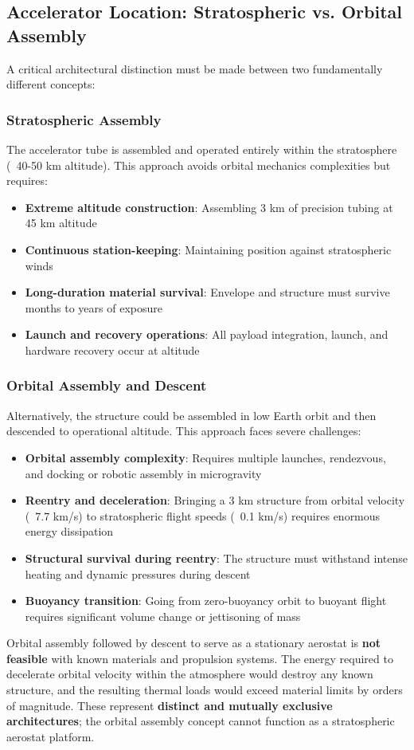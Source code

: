 \documentclass[12pt]{article}
\begin{document}
\subsection{Accelerator Location: Stratospheric vs. Orbital Assembly}
A critical architectural distinction must be made between two fundamentally different concepts:

\subsubsection{Stratospheric Assembly}
The accelerator tube is assembled and operated entirely within the stratosphere (~40-50 km altitude). This approach avoids orbital mechanics complexities but requires:
\begin{itemize}
    \item \textbf{Extreme altitude construction}: Assembling 3 km of precision tubing at 45 km altitude
    \item \textbf{Continuous station-keeping}: Maintaining position against stratospheric winds
    \item \textbf{Long-duration material survival}: Envelope and structure must survive months to years of exposure
    \item \textbf{Launch and recovery operations}: All payload integration, launch, and hardware recovery occur at altitude
\end{itemize}

\subsubsection{Orbital Assembly and Descent}
Alternatively, the structure could be assembled in low Earth orbit and then descended to operational altitude. This approach faces severe challenges:
\begin{itemize}
    \item \textbf{Orbital assembly complexity}: Requires multiple launches, rendezvous, and docking or robotic assembly in microgravity
    \item \textbf{Reentry and deceleration}: Bringing a 3 km structure from orbital velocity (~7.7 km/s) to stratospheric flight speeds (~0.1 km/s) requires enormous energy dissipation
    \item \textbf{Structural survival during reentry}: The structure must withstand intense heating and dynamic pressures during descent
    \item \textbf{Buoyancy transition}: Going from zero-buoyancy orbit to buoyant flight requires significant volume change or jettisoning of mass
\end{itemize}
Orbital assembly followed by descent to serve as a stationary aerostat is \textbf{not feasible} with known materials and propulsion systems. The energy required to decelerate orbital velocity within the atmosphere would destroy any known structure, and the resulting thermal loads would exceed material limits by orders of magnitude. These represent \textbf{distinct and mutually exclusive architectures}; the orbital assembly concept cannot function as a stratospheric aerostat platform.
\end{document}
